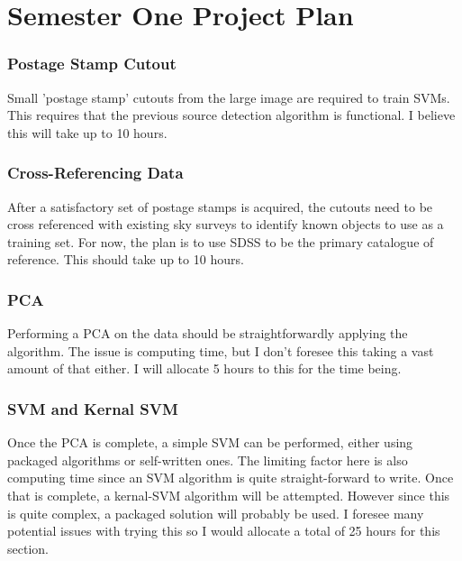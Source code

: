 \documentclass[a4paper,fleqn,usenatbib]{mnras}
\begin{document}






\appendix

\section{Semester One Project Plan}
\label{App:project plan}
\subsubsection{Postage Stamp Cutout}
Small 'postage stamp' cutouts from the large image are required to train SVMs. This requires that the previous source detection algorithm is functional. I believe this will take up to 10 hours. 
\subsubsection{Cross-Referencing Data}
After a satisfactory set of postage stamps is acquired, the cutouts need to be cross referenced with existing sky surveys to identify known objects to use as a training set. For now, the plan is to use SDSS to be the primary catalogue of reference. This should take up to 10 hours.
\subsubsection{PCA}
Performing a PCA on the data should be straightforwardly applying the algorithm. The issue is computing time, but I don't foresee this taking a vast amount of that either. I will allocate 5 hours to this for the time being.
\subsubsection{SVM and Kernal SVM}
Once the PCA is complete, a simple SVM can be performed, either using packaged algorithms or self-written ones. The limiting factor here is also computing time since an SVM algorithm is quite straight-forward to write.
Once that is complete, a kernal-SVM algorithm will be attempted. However since this is quite complex, a packaged solution will probably be used. I foresee many potential issues with trying this so I would allocate a total of 25 hours for this section.
\end{document}
